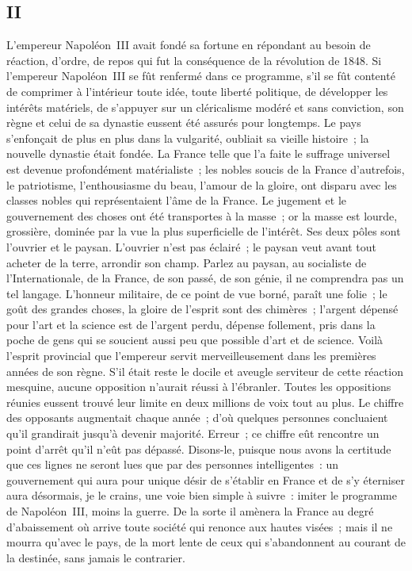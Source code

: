 \documentclass[french,twoside]{book} %
\begin{document}
\subsection[{II}]{II}
\noindent L’empereur Napoléon III avait fondé sa fortune en répondant au besoin de réaction, d’ordre, de repos qui fut la conséquence de la révolution de 1848. Si l’empereur Napoléon III se fût renfermé dans ce programme, s’il se fût contenté de comprimer à l’intérieur toute idée, toute liberté politique, de développer les intérêts matériels, de s’appuyer sur un cléricalisme modéré et sans conviction, son règne et celui de sa dynastie eussent été assurés pour longtemps. Le pays s’enfonçait de plus en plus dans la vulgarité, oubliait sa vieille histoire ; la nouvelle dynastie était fondée. La France telle que l’a faite le suffrage universel est devenue profondément matérialiste ; les nobles soucis de la France d’autrefois, le patriotisme, l’enthousiasme du beau, l’amour de la gloire, ont disparu avec les classes nobles qui représentaient l’âme de la France. Le jugement et le gouvernement des choses ont été transportes à la masse ; or la masse est lourde, grossière, dominée par la vue la plus superficielle de l’intérêt. Ses deux pôles sont l’ouvrier et le paysan. L’ouvrier n’est pas éclairé ; le paysan veut avant tout acheter de la terre, arrondir son champ. Parlez au paysan, au socialiste de l’Internationale, de la France, de son passé, de son génie, il ne comprendra pas un tel langage. L’honneur militaire, de ce point de vue borné, paraît une folie ; le goût des grandes choses, la gloire de l’esprit sont des chimères ; l’argent dépensé pour l’art et la science est de l’argent perdu, dépense follement, pris dans la poche de gens qui se soucient aussi peu que possible d’art et de science. Voilà l’esprit provincial que l’empereur servit merveilleusement dans les premières années de son règne. S’il était reste le docile et aveugle serviteur de cette réaction mesquine, aucune opposition n’aurait réussi à l’ébranler. Toutes les oppositions réunies eussent trouvé leur limite en deux millions de voix tout au plus. Le chiffre des opposants augmentait chaque année ; d’où quelques personnes concluaient qu’il grandirait jusqu’à devenir majorité. Erreur ; ce chiffre eût rencontre un point d’arrêt qu’il n’eût pas dépassé. Disons-le, puisque nous avons la certitude que ces lignes ne seront lues que par des personnes intelligentes : un gouvernement qui aura pour unique désir de s’établir en France et de s’y éterniser aura désormais, je le crains, une voie bien simple à suivre : imiter le programme de Napoléon III, moins la guerre. De la sorte il amènera la France au degré d’abaissement où arrive toute société qui renonce aux hautes visées ; mais il ne mourra qu’avec le pays, de la mort lente de ceux qui s’abandonnent au courant de la destinée, sans jamais le contrarier.\par
\end{document}
